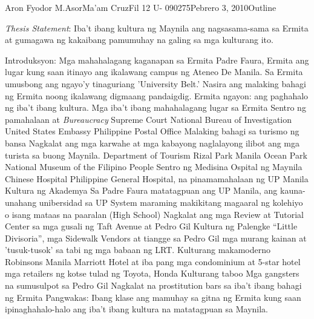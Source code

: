 \documentclass[12pt,letterpaper]{article}
\begin{document}
\begin{mla}{Aron Fyodor M.}{Asor}{Ma'am Cruz}{Fil 12 U- 090275}{Pebrero 3, 2010}{Outline}


\noindent \textit{Thesis Statement}: Iba't ibang kultura ng Maynila ang nagsasama-sama sa Ermita at gumagawa
ng kakaibang pamumuhay na galing sa mga kulturang ito.

\begin{outline}[enumerate]
	\1 Introduksyon: Mga mahahalagang kaganapan sa Ermita
		\2 Padre Faura, Ermita ang lugar kung saan itinayo ang ikalawang campus ng Ateneo De Manila.
		\2 Sa Ermita umusbong ang ngayo'y tinaguriang 'University Belt.'
		\2 Nasira ang malaking bahagi ng Ermita noong ikalawang digmaang pandaigdig.
	\1 Ermita ngayon: ang paghahalo ng iba't ibang kultura.
		\2 Mga iba't ibang mahahalagang lugar sa Ermita
			\3 Sentro ng pamahalaan at \textit{Bureaucracy} 
				\4 Supreme Court
				\4 National Bureau of Investigation 
				\4 United States Embassy
				\4 Philippine Postal Office
			\3 Malaking bahagi sa turismo ng bansa
				\4 Nagkalat ang mga karwahe at mga kabayong naglalayong ilibot ang mga turista sa
				buong Maynila.
				\4 Department of Tourism
				\4 Rizal Park
				\4 Manila Ocean Park
				\4 National Museum of the Filipino People
			\3 Sentro ng Medisina 
				\4 Ospital ng Maynila
				\4 Chinese Hospital
				\4 Philippine General Hospital, na pinamamahalaan ng UP Manila
		\2 Kultura ng Akademya 
			\3 Sa Padre Faura matatagpuan ang UP Manila, ang kauna-unahang unibersidad sa UP System
			\3 maraming makikitang magaaral ng kolehiyo o isang mataas na
			paaralan (High School)
			\3 Nagkalat ang mga Review at Tutorial Center sa mga gusali ng Taft Avenue at Pedro Gil
		\2 Kultura ng Palengke 
			\3 ``Little Divisoria'', mga Sidewalk Vendors at tiangge sa Pedro Gil
			\3 mga murang kainan at 'tusuk-tusok' sa tabi ng mga babaan ng LRT.
		\2 Kulturang makamoderno
			\3 Robinsons Manila
			\3 Marriott Hotel at iba pang mga condominium at 5-star hotel
			\3 mga retailers ng kotse tulad ng Toyota, Honda
		\2 Kulturang taboo
			\3 Mga gangsters na sumusulpot sa Pedro Gil
			\3 Nagkalat na prostitution bars sa iba't ibang bahagi ng Ermita
	\1 Pangwakas: Ibang klase ang mamuhay sa gitna ng Ermita kung saan ipinaghahalo-halo ang iba't ibang kultura
	na matatagpuan sa Maynila.

\end{outline}
						

\end{mla}
\end{document}
